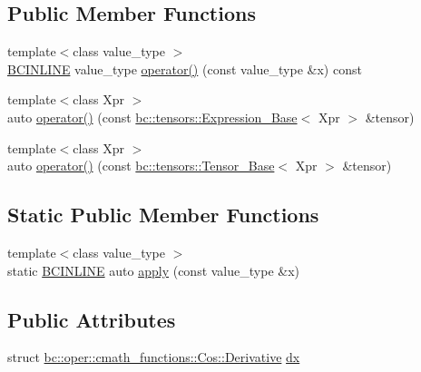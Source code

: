 \subsection*{Public Member Functions}
\begin{DoxyCompactItemize}
\item 
{\footnotesize template$<$class value\+\_\+type $>$ }\\\hyperlink{common_8h_a6699e8b0449da5c0fafb878e59c1d4b1}{B\+C\+I\+N\+L\+I\+NE} value\+\_\+type \hyperlink{structbc_1_1oper_1_1cmath__functions_1_1Cos_a2c0c9df694d1eff1f0834ed3efa98cde}{operator()} (const value\+\_\+type \&x) const
\item 
{\footnotesize template$<$class Xpr $>$ }\\auto \hyperlink{structbc_1_1oper_1_1cmath__functions_1_1Cos_a1afeea7e4d021e7f74d997a9ab41d4ea}{operator()} (const \hyperlink{classbc_1_1tensors_1_1Expression__Base}{bc\+::tensors\+::\+Expression\+\_\+\+Base}$<$ Xpr $>$ \&tensor)
\item 
{\footnotesize template$<$class Xpr $>$ }\\auto \hyperlink{structbc_1_1oper_1_1cmath__functions_1_1Cos_adc694e9ccf2b6fc5e1578ee65b07e0e6}{operator()} (const \hyperlink{classbc_1_1tensors_1_1Tensor__Base}{bc\+::tensors\+::\+Tensor\+\_\+\+Base}$<$ Xpr $>$ \&tensor)
\end{DoxyCompactItemize}
\subsection*{Static Public Member Functions}
\begin{DoxyCompactItemize}
\item 
{\footnotesize template$<$class value\+\_\+type $>$ }\\static \hyperlink{common_8h_a6699e8b0449da5c0fafb878e59c1d4b1}{B\+C\+I\+N\+L\+I\+NE} auto \hyperlink{structbc_1_1oper_1_1cmath__functions_1_1Cos_a68eaf94baf5d541506612f3c15898497}{apply} (const value\+\_\+type \&x)
\end{DoxyCompactItemize}
\subsection*{Public Attributes}
\begin{DoxyCompactItemize}
\item 
struct \hyperlink{structbc_1_1oper_1_1cmath__functions_1_1Cos_1_1Derivative}{bc\+::oper\+::cmath\+\_\+functions\+::\+Cos\+::\+Derivative} \hyperlink{structbc_1_1oper_1_1cmath__functions_1_1Cos_a062dd5e1b8667637520840ebe3b05ba5}{dx}
\end{DoxyCompactItemize}


